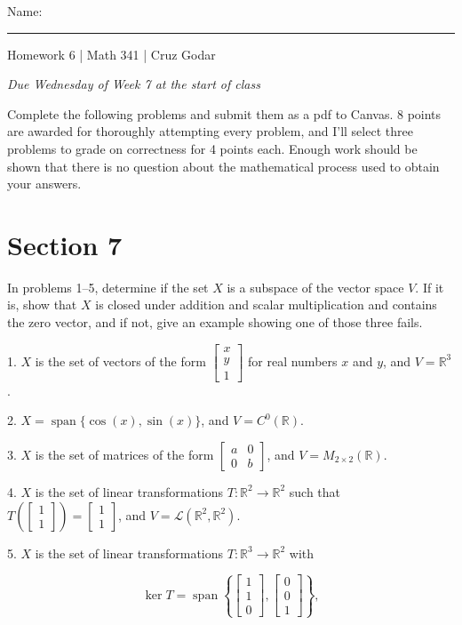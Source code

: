 \documentclass{article}
\begin{document}
\Large Name: \rule{2in}{0.15mm} \hfill Homework 6 | Math 341 | Cruz Godar \vspace{4pt} \normalsize

\textit{Due Wednesday of Week 7 at the start of class}

Complete the following problems and submit them as a pdf to Canvas. 8 points are awarded for thoroughly attempting every problem, and I'll select three problems to grade on correctness for 4 points each. Enough work should be shown that there is no question about the mathematical process used to obtain your answers.

\section{Section 7}

In problems 1--5, determine if the set $X$ is a subspace of the vector space $V$. If it is, show that $X$ is closed under addition and scalar multiplication and contains the zero vector, and if not, give an example showing one of those three fails.

1. $X$ is the set of vectors of the form $\left[\begin{array}{c} x \\ y \\ 1 \end{array}\right]$ for real numbers $x$ and $y$, and $V = \mathbb{R}^3$.

2. $X = \operatorname{span} \{ \cos(x), \sin(x) \}$, and $V = C^0(\mathbb{R})$.

3. $X$ is the set of matrices of the form $\left[\begin{array}{cc} a& 0 \\ 0& b \end{array}\right]$, and $V = M_{2 \times 2}(\mathbb{R})$.

4. $X$ is the set of linear transformations $T : \mathbb{R}^2 \to \mathbb{R}^2$ such that $T \left( \left[\begin{array}{c} 1 \\ 1 \end{array}\right] \right) = \left[\begin{array}{c} 1 \\ 1 \end{array}\right]$, and $V = \mathcal{L}(\mathbb{R}^2, \mathbb{R}^2)$.

5. $X$ is the set of linear transformations $T : \mathbb{R}^3 \to \mathbb{R}^2$ with

$$
	\ker T = \operatorname{span}\left\{ \left[\begin{array}{c} 1 \\ 1 \\ 0 \end{array}\right], \left[\begin{array}{c} 0 \\ 0 \\ 1 \end{array}\right] \right\},
$$
\end{document}
